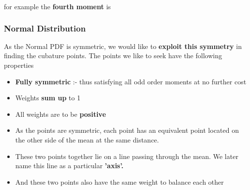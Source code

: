 \documentclass[11pt]{beamer}
\begin{document}
\begin{frame}
 for example the {\bf fourth moment} is
\end{frame}
\begin{frame}
\frametitle{Normal Distribution}
As the Normal PDF is symmetric, we would like to {\bf exploit this symmetry} in finding the cubature points. The points we like to seek have the following properties 
\begin{itemize}[<+->]
\item {\bf Fully symmetric} :- thus satisfying all odd order moments at no further cost
\item Weights {\bf sum up} to 1
\item All weights are to be {\bf positive}
\item As the points are symmetric, each point has an equivalent point located on the other side of the mean at the same distance.
\item These two points together lie on a line passing through the mean. We later name this line as  a particular {\bf 'axis'.} 
\item And these two points also have the same weight to balance each other
\end{itemize}
\end{frame}
\end{document}
